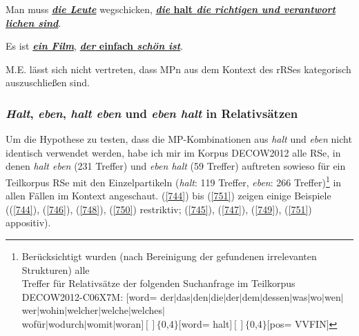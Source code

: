 \begin{exe}
	\ex\label{742} 
	Man muss \underline{\textit{\textbf{die Leute}}} wegschicken, \underline{\textbf{\textit{die} halt \textit{die richtigen 		und verantwort}}}\- \underline{\textit{\textbf{lichen sind}}}.
\end{exe}
\vspace{-0.65cm}
\begin{exe}
	\ex\label{743} 
	Es ist \underline{\textbf{\textit{ein Film}}}, \underline{\textbf{\textit{der} einfach \textit{schön ist}}}.
\end{exe}
M.E. lässt sich nicht vertreten, dass MPn aus dem Kontext des rRSes kategorisch auszuschließen sind.

\subsubsection{\textit{Halt}, \textit{eben}, \textit{halt eben} und \textit{eben halt} in Relativsätzen}
Um die Hypothese zu testen, dass die MP-Kombinationen aus \textit{halt} und \textit{eben} nicht identisch verwendet werden, habe ich mir im Korpus DECOW2012 alle RSe, in denen \textit{halt eben} (231 Treffer) und \textit{eben halt} (59 Treffer) auftreten sowieso für ein Teilkorpus RSe mit den Einzelpartikeln (\textit{halt}: 119 Treffer, \textit{eben}: 266 Treffer)\footnote{Berücksichtigt wurden (nach Bereinigung der gefundenen irrelevanten Strukturen) alle \\ Treffer für Relativsätze der folgenden Suchanfrage im Teilkorpus DECOW2012-C06X7M:
$[$word= \glqq der$\vert$das$\vert$den$\vert$die$\vert$der$\vert$dem$\vert$dessen$\vert$was$\vert$wo$\vert$wen$\vert$wer$\vert$wohin$\vert$welcher$\vert$welche$\vert$welches$\vert$\\wofür$\vert$wo\-durch$\vert$womit$\vert$woran\grqq{}$][]\lbrace$0,4$\rbrace[$word= \glqq halt\grqq{}$][]\lbrace$0,4$\rbrace[$pos= \glqq VVFIN\grqq{}$]$} in allen Fällen im Kontext angeschaut. (\ref{744}) bis (\ref{751}) zeigen einige Beispiele ((\ref{744}), (\ref{746}), (\ref{748}), (\ref{750}) restriktiv; (\ref{745}), (\ref{747}), (\ref{749}), (\ref{751}) appositiv).

